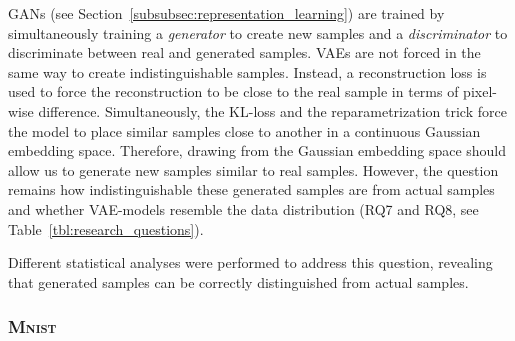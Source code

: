 \acp{GAN} (see Section~\ref{subsubsec:representation_learning}) are trained by simultaneously training a \textit{generator} to create new samples and a \textit{discriminator} to discriminate between real and generated samples.
\acp{VAE} are not forced in the same way to create indistinguishable samples.
Instead, a reconstruction loss is used to force the reconstruction to be close to the real sample in terms of pixel-wise difference.
Simultaneously, the \ac{KL}-loss and the reparametrization trick force the model to place similar samples close to another in a continuous Gaussian embedding space.
Therefore, drawing from the Gaussian embedding space should allow us to generate new samples similar to real samples.
However, the question remains how indistinguishable these generated samples are from actual samples and whether \ac{VAE}-models resemble the data distribution (RQ7 and RQ8, see Table~\ref{tbl:research_questions}).

Different statistical analyses were performed to address this question, revealing that generated samples can be correctly distinguished from actual samples.

\subsubsection{\textsc{Mnist}}\label{subsubsec:pixel_wise_distribution_mnist}


